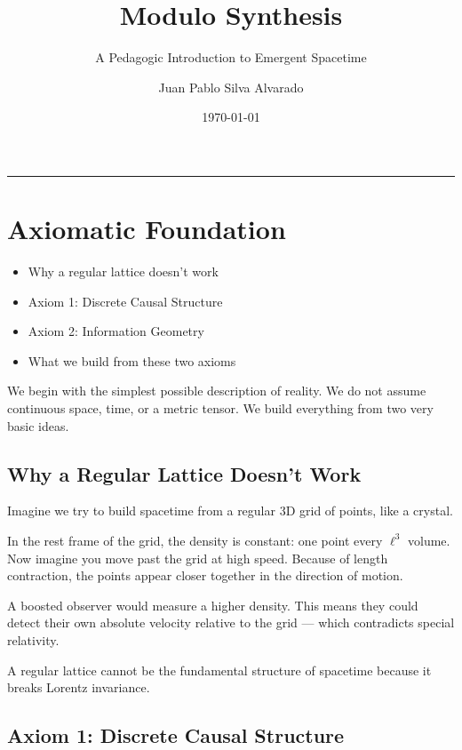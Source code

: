 \documentclass[11pt, a4paper, openany]{book}
\title{Modulo Synthesis}
\subtitle{A Pedagogic Introduction to Emergent Spacetime}
\author{Juan Pablo Silva Alvarado}
\date{\today}
\makeatletter
\newenvironment{introduction}[1][Chapter Overview]{%
  \begin{tcolorbox}[
    enhanced,
    colback=structurecolor!5,
    colframe=structurecolor,
    colbacktitle=structurecolor,
    coltitle=white,
    fonttitle=\bfseries,
    title={#1},
    arc=3pt, boxrule=1pt,
    left=10pt, right=10pt, top=8pt, bottom=8pt,
    before skip=15pt, after skip=15pt
  ]
  \begin{itemize}[leftmargin=*, itemsep=3pt]
}{%
  \end{itemize}
  \end{tcolorbox}
}
\gdef\@subtitle{}
\gdef\@extrainfo{}
\renewcommand{\maketitle}{%
  \begin{titlepage}
    \centering
    \vspace*{3cm}
    
    {\Huge\bfseries\color{structurecolor}\@title\par}
    \vspace{0.8cm}
    
    \ifx\@subtitle\empty\else
      {\Large\color{gray!80}\@subtitle\par}
    \fi
    \vspace{2cm}
    
    {\color{main}\rule{0.6\textwidth}{2pt}\par}
    \vspace{2cm}
    
    {\large\@author\par}
    \vspace{1cm}
    
    \vfill
    
    \ifx\@extrainfo\empty\else
      \begin{minipage}{0.75\textwidth}
        \centering
        \itshape\color{gray!70}\@extrainfo
      \end{minipage}
    \fi
    
    \vspace{1cm}
    {\normalsize\@date\par}
    
  \end{titlepage}
}
\makeatother
\begin{document}
\maketitle
\frontmatter
\tableofcontents

\mainmatter


\chapter{Axiomatic Foundation}

\begin{introduction}
  \item Why a regular lattice doesn't work
  \item Axiom 1: Discrete Causal Structure
  \item Axiom 2: Information Geometry
  \item What we build from these two axioms
\end{introduction}

We begin with the simplest possible description of reality.
We do not assume continuous space, time, or a metric tensor. We build everything from two very basic ideas.

\section{Why a Regular Lattice Doesn't Work}

Imagine we try to build spacetime from a regular 3D grid of points, like a crystal.

In the rest frame of the grid, the density is constant: one point every $\ell^3$ volume.
Now imagine you move past the grid at high speed. Because of length contraction, the points appear closer together in the direction of motion.

A boosted observer would measure a higher density.
This means they could detect their own absolute velocity relative to the grid --- which contradicts special relativity.

\begin{result}
A regular lattice cannot be the fundamental structure of spacetime because it breaks Lorentz invariance.
\end{result}

\section{Axiom 1: Discrete Causal Structure}
\end{document}
